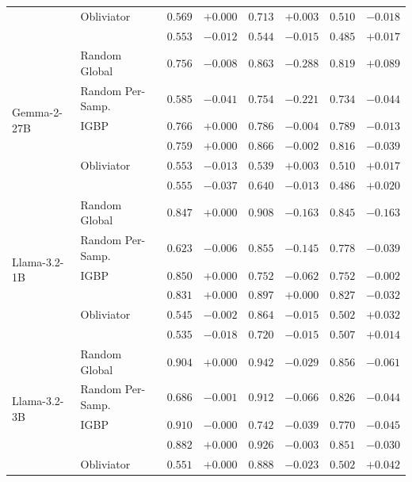 \begin{longtable}{ll|rr|rr|rr}
   & Obliviator & $0.569$ & $+0.000$ & $0.713$ & $+0.003$ & $0.510$ & $-0.018$ \\
   & \TanGCE{} & $\boldsymbol{0.553}$ & $-0.012$ & $\boldsymbol{0.544}$ & $-0.015$ & $\boldsymbol{0.485}$ & $+0.017$ \\
  \midrule
  \multirow{6}{*}{Gemma-2-27B} & Random Global & $0.756$ & $-0.008$ & $0.863$ & $-0.288$ & $0.819$ & $+0.089$ \\
   & Random Per-Samp. & $0.585$ & $-0.041$ & $0.754$ & $-0.221$ & $0.734$ & $-0.044$ \\
   & IGBP & $0.766$ & $\boldsymbol{+0.000}$ & $0.786$ & $-0.004$ & $0.789$ & $-0.013$ \\
   & \AmbGCE{} & $0.759$ & $+0.000$ & $0.866$ & $\boldsymbol{-0.002}$ & $0.816$ & $-0.039$ \\
   & Obliviator & $\boldsymbol{0.553}$ & $-0.013$ & $\boldsymbol{0.539}$ & $+0.003$ & $0.510$ & $+0.017$ \\
   & \TanGCE{} & $0.555$ & $-0.037$ & $0.640$ & $-0.013$ & $\boldsymbol{0.486}$ & $+0.020$ \\
  \midrule
  \multirow{6}{*}{Llama-3.2-1B} & Random Global & $0.847$ & $+0.000$ & $0.908$ & $-0.163$ & $0.845$ & $-0.163$ \\
   & Random Per-Samp. & $0.623$ & $-0.006$ & $0.855$ & $-0.145$ & $0.778$ & $-0.039$ \\
   & IGBP & $0.850$ & $\boldsymbol{+0.000}$ & $0.752$ & $-0.062$ & $0.752$ & $\boldsymbol{-0.002}$ \\
   & \AmbGCE{} & $0.831$ & $+0.000$ & $0.897$ & $\boldsymbol{+0.000}$ & $0.827$ & $-0.032$ \\
   & Obliviator & $0.545$ & $-0.002$ & $0.864$ & $-0.015$ & $\boldsymbol{0.502}$ & $+0.032$ \\
   & \TanGCE{} & $\boldsymbol{0.535}$ & $-0.018$ & $\boldsymbol{0.720}$ & $-0.015$ & $0.507$ & $+0.014$ \\
  \midrule
  \multirow{6}{*}{Llama-3.2-3B} & Random Global & $0.904$ & $+0.000$ & $0.942$ & $-0.029$ & $0.856$ & $-0.061$ \\
   & Random Per-Samp. & $0.686$ & $-0.001$ & $0.912$ & $-0.066$ & $0.826$ & $-0.044$ \\
   & IGBP & $0.910$ & $\boldsymbol{-0.000}$ & $\boldsymbol{0.742}$ & $-0.039$ & $0.770$ & $-0.045$ \\
   & \AmbGCE{} & $0.882$ & $+0.000$ & $0.926$ & $\boldsymbol{-0.003}$ & $0.851$ & $-0.030$ \\
   & Obliviator & $0.551$ & $+0.000$ & $0.888$ & $-0.023$ & $0.502$ & $+0.042$ \\

\end{longtable}
